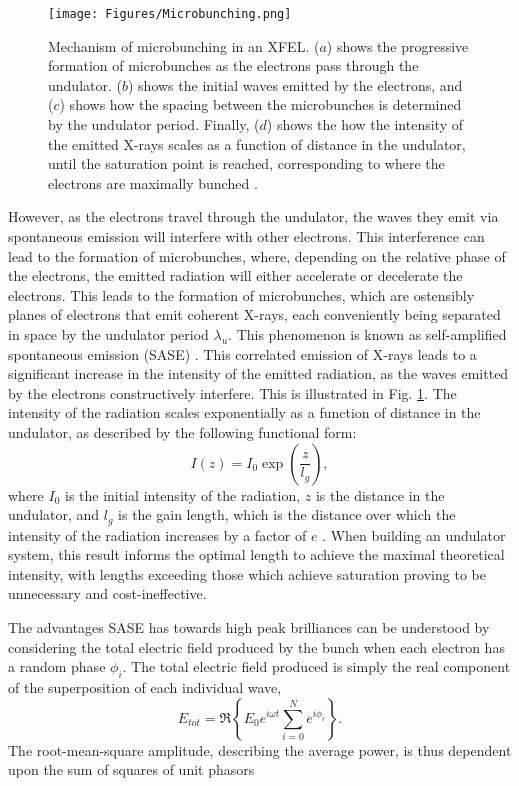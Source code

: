 \documentclass[aps,prb,twocolumn,superscriptaddress]{revtex4-2}
\begin{document}
\begin{figure}[h]
    \centering
    \texttt{[image: Figures/Microbunching.png]}
    \caption{Mechanism of microbunching in an XFEL. ($a$) shows the progressive
        formation of microbunches as the electrons pass through the undulator.
        ($b$) shows the initial waves emitted by the electrons, and ($c$) shows
        how the spacing between the microbunches is determined by the undulator
        period. Finally, ($d$) shows the how the intensity of the emitted X-rays
        scales as a function of distance in the undulator, until the saturation
        point is reached, corresponding to where the electrons are maximally 
        bunched \cite{EMMA}.}
    \label{fig:Undulator}
\end{figure}
However, as the electrons travel through the
undulator, the waves they emit via spontaneous emission will interfere with 
other electrons. This interference can lead to the formation of microbunches,
where, depending on the relative phase of the electrons, the emitted radiation
will either accelerate or decelerate the electrons. This leads to the formation
of microbunches, which are ostensibly planes of electrons that emit coherent
X-rays, each conveniently being separated in space by the undulator period
$\lambda_u$. This phenomenon is known as self-amplified spontaneous emission 
(SASE) \cite{Saldin2006}.
This correlated emission of X-rays leads to a significant increase in the intensity
of the emitted radiation, as the waves emitted by the electrons constructively
interfere. This is illustrated in Fig. \ref{fig:Undulator}. The intensity of the
radiation scales exponentially as a function of distance in the undulator, as described 
by the following functional form:
\begin{equation}
    I(z) = I_0\exp\left(\frac{z}{l_g}\right),
\end{equation}
where $I_0$ is the initial intensity of the radiation, $z$ is the distance in the
undulator, and $l_g$ is the gain length, which is the distance over which the
intensity of the radiation increases by a factor of $e$ \cite{Bonifacio}. When 
building an undulator system, this result informs the optimal length to achieve 
the maximal theoretical intensity, with lengths exceeding those which achieve saturation 
proving to be unnecessary and cost-ineffective.

    The advantages SASE has towards high peak brilliances can be understood by 
considering the total electric field produced by the bunch when each electron
has a random phase $\phi_i$. The total electric field produced is simply the
real component of the superposition of each individual wave,
\begin{equation}
    E_{tot} = \Re \left\{ E_0 e^{i\omega t}\sum_{i = 0}^N e^{i\phi_i} \right \}.
\end{equation}
The root-mean-square amplitude, describing the average power, is thus dependent
upon the sum of squares of unit phasors
\end{document}
